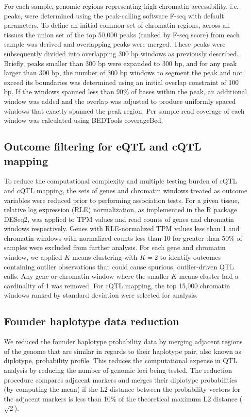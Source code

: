 For each sample, genomic regions representing high chromatin accessibility, i.e. peaks, were determined using the peak-calling software F-seq with default parameters. To define an initial common set of chromatin regions, across all tissues the union set of the top 50,000 peaks (ranked by F-seq score) from each sample was derived and overlapping peaks were merged. These peaks were subsequently divided into overlapping 300 bp windows as previously described. Briefly, peaks smaller than 300 bp were expanded to 300 bp, and for any peak larger than 300 bp, the number of 300 bp windows to segment the peak and not exceed its boundaries was determined using an initial overlap constraint of 100 bp. If the windows spanned less than 90\% of bases within the peak, an additional window was added and the overlap was adjusted to produce uniformly spaced windows that exactly spanned the peak region. Per sample read coverage of each window was calculated using BEDTools coverageBed.

\subsection{Outcome filtering for eQTL and cQTL mapping}

To reduce the computational complexity and multiple testing burden of eQTL and cQTL mapping, the sets of genes and chromatin windows treated as outcome variables were reduced prior to performing association tests. For a given tissue, relative log expression (RLE) normalization, as implemented in the R package DESeq2, was applied to TPM values and read counts of genes and chromatin windows respectively. Genes with RLE-normalized TPM values less than 1 and chromatin windows with normalized counts less than 10 for greater than 50\% of samples were excluded from further analysis. For each gene and chromatin window, we applied $K$-means clustering with $K=2$ to identify outcomes containing outlier observations that could cause spurious, outlier-driven QTL calls. Any gene or chromatin window where the smaller $K$-means cluster had a cardinality of 1 was removed. For cQTL mapping, the top 15,000 chromatin windows ranked by standard deviation were selected for analysis.

\subsection{Founder haplotype data reduction}

We reduced the founder haplotype probability data by merging adjacent regions of the genome that are similar in regards to their haplotype pair, also known as diplotype, probability profile. This reduces the computational expense in QTL analysis by reducing the number of genomic loci being tested. The reduction procedure compares adjacent markers and merges their diplotype probabilities (by computing the mean) if the L2 distance between the probability vectors for the adjacent markers is less than 10\% of the theoretical maximum L2 distance ($\sqrt{2}$).

